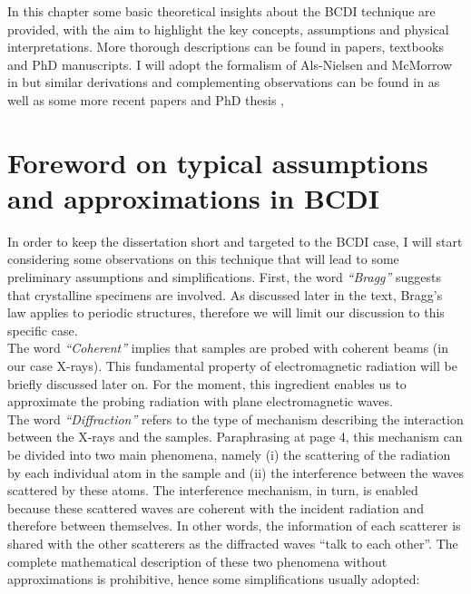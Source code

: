 
In this chapter some basic theoretical insights about the BCDI technique are provided, with the aim to highlight the key 
concepts, assumptions and physical interpretations. More thorough descriptions can be found in papers, textbooks 
and PhD manuscripts. I will adopt the formalism of Als-Nielsen and McMorrow in \cite{alsnielsen_mcmorrow2011} but similar 
derivations and complementing observations can be found in \cite{guinier1994, paganin2006coherent} as well as some more recent papers \cite{vartanyants2013coherentxraydiffractionimaging} 
and PhD thesis \cite{dupraz:tel-01285735, girard:tel-02906931, Atlan2023}
, 

\section{Foreword on typical assumptions and approximations in BCDI}
In order to keep the dissertation short and targeted to the BCDI case, I will start considering some observations on this
technique that will lead to some preliminary assumptions and simplifications. First, the word \textit{``Bragg''} suggests that 
crystalline specimens are involved. As discussed later in the text, Bragg's law applies to periodic structures, therefore 
we will limit our discussion to this specific case. \\
The word \textit{``Coherent''} implies that samples are probed with coherent beams (in our case X-rays). This fundamental property of 
electromagnetic radiation will be briefly discussed later on. For the moment, this ingredient enables us to approximate the 
probing radiation with plane electromagnetic waves. \\
The word \textit{``Diffraction''} refers to the type of mechanism describing the interaction between the X-rays and the 
samples. Paraphrasing \cite{guinier1994} at page 4, this mechanism can be divided into two main phenomena, namely (i) 
the scattering of the radiation by each individual atom in the sample and (ii) the interference between the waves scattered 
by these atoms. The interference mechanism, in turn, is enabled because these scattered waves are coherent with the incident 
radiation and therefore between themselves. In other words, the information of each scatterer is shared with the other scatterers 
as the diffracted waves ``talk to each other''. The complete mathematical description of these two phenomena without approximations 
is prohibitive, hence some simplifications usually adopted: 
